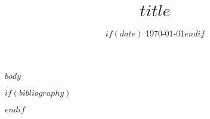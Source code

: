 \documentclass[11pt]{article}
\title{$title$}
\author$if(author.orcid)$[$author.orcid$]$endif${$author.name$}
\date{ $if(date)$ \today $endif$ }
\date{}
\begin{document}
\maketitle
$body$


$if(bibliography)$
{}

$endif$
\end{document}
